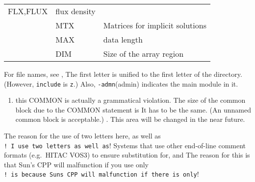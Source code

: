 \begin{longtable}[]{@{}lll@{}}
\begin{minipage}[t]{0.30\columnwidth}
FLX,FLUX\strut
\end{minipage} & \begin{minipage}[t]{0.30\columnwidth}\raggedright
flux density\strut
\end{minipage}\tabularnewline
\begin{minipage}[t]{0.30\columnwidth}\raggedright
\strut
\end{minipage} & \begin{minipage}[t]{0.30\columnwidth}\raggedright
MTX\strut
\end{minipage} & \begin{minipage}[t]{0.30\columnwidth}\raggedright
Matrices for implicit solutions\strut
\end{minipage}\tabularnewline
\begin{minipage}[t]{0.30\columnwidth}\raggedright
\strut
\end{minipage} & \begin{minipage}[t]{0.30\columnwidth}\raggedright
MAX\strut
\end{minipage} & \begin{minipage}[t]{0.30\columnwidth}\raggedright
data length\strut
\end{minipage}\tabularnewline
\begin{minipage}[t]{0.30\columnwidth}\raggedright
\strut
\end{minipage} & \begin{minipage}[t]{0.30\columnwidth}\raggedright
DIM\strut
\end{minipage} & \begin{minipage}[t]{0.30\columnwidth}\raggedright
Size of the array region\strut
\end{minipage}\tabularnewline
\bottomrule
\end{longtable}

For file names, see , The first letter is unified to the first letter of
the directory. (However, {\texttt{include}} is {\texttt{z}}.) Also,
{\texttt{-admn}}(admin) indicates the main module in it.

\begin{enumerate}
\def\labelenumi{\arabic{enumi}.}
\tightlist
\item
  this COMMON is actually a grammatical violation. The size of the
  common block due to the COMMON statement is It has to be the same. (An
  unnamed common block is acceptable.) . This area will be changed in
  the near future.
\end{enumerate}

The reason for the use of two letters here, as well as
\texttt{!\ I\ use\ two\ letters\ as\ well\ as}! Systems that use other
end-of-line comment formats (e.g.~HITAC VOS3) to ensure substitution
for, and The reason for this is that Sun's CPP will malfunction if you
use only
\texttt{!\ is\ because\ Sun\textquotesingle{}s\ CPP\ will\ malfunction\ if\ there\ is\ only}!
